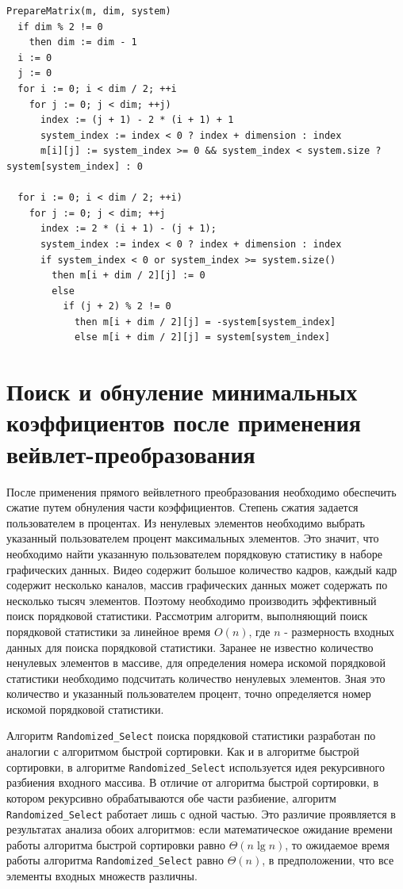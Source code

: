 \begin{lstlisting}[style=pseudocode,caption={Код процедуры PrepareMatrix},label=lst:PrepareMatrix]
PrepareMatrix(m, dim, system)
  if dim % 2 != 0
    then dim := dim - 1
  i := 0
  j := 0
  for i := 0; i < dim / 2; ++i
    for j := 0; j < dim; ++j)
      index := (j + 1) - 2 * (i + 1) + 1
      system_index := index < 0 ? index + dimension : index
      m[i][j] := system_index >= 0 && system_index < system.size ? system[system_index] : 0
      
  for i := 0; i < dim / 2; ++i)
    for j := 0; j < dim; ++j
      index := 2 * (i + 1) - (j + 1);
      system_index := index < 0 ? index + dimension : index
      if system_index < 0 or system_index >= system.size()
        then m[i + dim / 2][j] := 0
        else
          if (j + 2) % 2 != 0
            then m[i + dim / 2][j] = -system[system_index]
            else m[i + dim / 2][j] = system[system_index]
\end{lstlisting}

\section{Поиск и обнуление минимальных коэффициентов после применения вейвлет-преобразования}
После применения прямого вейвлетного преобразования необходимо обеспечить 
сжатие путем обнуления части коэффициентов. Степень сжатия задается 
пользователем в процентах. Из ненулевых элементов необходимо выбрать указанный пользователем процент 
максимальных элементов. Это значит, что необходимо найти указанную пользователем 
порядковую статистику в наборе графических данных. 
Видео содержит большое количество кадров, каждый кадр содержит несколько каналов, 
массив графических данных может содержать по несколько тысяч элементов. 
Поэтому необходимо производить эффективный поиск порядковой статистики. Рассмотрим 
алгоритм, выполняющий поиск порядковой статистики за линейное время $O(n)$, где $n$ - 
размерность входных данных для поиска порядковой статистики.
Заранее не известно количество ненулевых элементов в массиве, 
для определения номера искомой порядковой статистики необходимо подсчитать количество ненулевых элементов. 
Зная это количество и указанный пользователем процент, точно определяется номер искомой порядковой статистики. 

Алгоритм \texttt{Randomized\_Select} поиска порядковой статистики разработан по аналогии 
с алгоритмом быстрой сортировки. Как и в алгоритме быстрой сортировки, в алгоритме 
\texttt{Randomized\_Select} используется идея рекурсивного разбиения входного массива. 
В отличие от алгоритма быстрой сортировки, в котором рекурсивно обрабатываются обе части разбиение, 
алгоритм \texttt{Randomized\_Select} работает лишь с одной частью. Это различие проявляется 
в результатах анализа обоих алгоритмов: если математическое ожидание времени работы
алгоритма быстрой сортировки равно $\Theta(n \lg n)$, то ожидаемое время работы алгоритма 
\texttt{Randomized\_Select} равно $\Theta(n)$, в предположении, что все элементы входных множеств различны.

